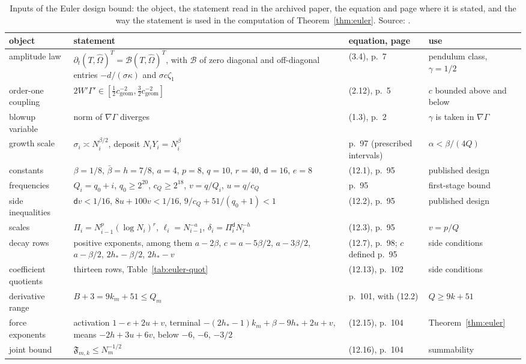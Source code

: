 \documentclass[11pt]{article}
\theoremstyle{remark}
\begin{document}
\begin{table}[t]
\centering\footnotesize
\setlength{\tabcolsep}{3pt}
\begin{tabular}{@{}L{3.1cm}L{5.6cm}L{3.2cm}L{3.0cm}@{}}
\toprule
object & statement & equation, page & use \\
\midrule
amplitude law & $\partial_{t}(T,\widehat\Omega)^{T}=\mathcal B(T,\widehat\Omega)^{T}$, with $\mathcal B$ of zero diagonal and off-diagonal entries $-d/(\sigma\kappa)$ and $\sigma c\zeta_{1}$ & (3.4), p.~7 & pendulum class, $\gamma=1/2$ \\
order-one coupling & $2W'\Gamma'\in[\tfrac12c_{\mathrm{geom}}^{-2},\tfrac32c_{\mathrm{geom}}^{-2}]$ & (2.12), p.~5 & $c$ bounded above and below \\
blowup variable & norm of $\nabla\Gamma$ diverges & (1.3), p.~2 & $\gamma$ is taken in $\nabla\Gamma$ \\
growth scale & $\sigma_{i}\asymp N_{i}^{\beta/2}$, deposit $N_{i}Y_{i}=N_{i}^{\beta}$ & p.~97 (prescribed intervals) & $\alpha<\beta/(4Q)$ \\
constants & $\beta=1/8$, $\bar\beta=h=7/8$, $a=4$, $p=8$, $q=10$, $r=40$, $\mathsf d=16$, $e=8$ & (12.1), p.~95 & published design \\
frequencies & $Q_{i}=q_{0}+i$, $q_{0}\ge2^{20}$, $c_{Q}\ge2^{18}$, $v=q/Q_{i}$, $u=q/c_{Q}$ & p.~95 & first-stage bound \\
side inequalities & $\mathsf dv<1/16$, $8u+100v<1/16$, $9/c_{Q}+51/(q_{0}+1)<1$ & (12.2), p.~95 & published design \\
scales & $\Pi_{i}=N_{i-1}^{p}(\log N_{i})^{r}$, $\ell_{i}=N_{i-1}^{-a}$, $\delta_{i}=\Pi_{i}^{\mathsf d}N_{i}^{-h}$ & (12.3), p.~95 & $v=p/Q$ \\
decay rows & positive exponents, among them $a-2\beta$, $c=a-5\beta/2$, $a-3\beta/2$, $a-\beta/2$, $2h_{*}-\beta/2$, $2h_{*}-v$ & (12.7), p.~98; $c$ defined p.~95 & side conditions \\
coefficient quotients & thirteen rows, Table~\ref{tab:euler-quot} & (12.13), p.~102 & side conditions \\
derivative range & $B+3=9k_{m}+51\le Q_{m}$ & p.~101, with (12.2) & $Q\ge9k+51$ \\
force exponents & activation $1-e+2u+v$, terminal $-(2h_{*}-1)k_{m}+\beta-9h_{*}+2u+v$, means $-2h+3u+6v$, below $-6$, $-6$, $-3/2$ & (12.15), p.~104 & Theorem~\ref{thm:euler} \\
joint bound & $\mathfrak F_{m,k}\le N_{m}^{-1/2}$ & (12.16), p.~104 & summability \\
\bottomrule
\end{tabular}
\caption{Inputs of the Euler design bound: the object, the statement read in the archived paper, the equation and page
where it is stated, and the way the statement is used in the computation of Theorem~\ref{thm:euler}.
Source: \cite{ab-euler}.}\label{tab:ab-euler}
\end{table}
\end{document}
